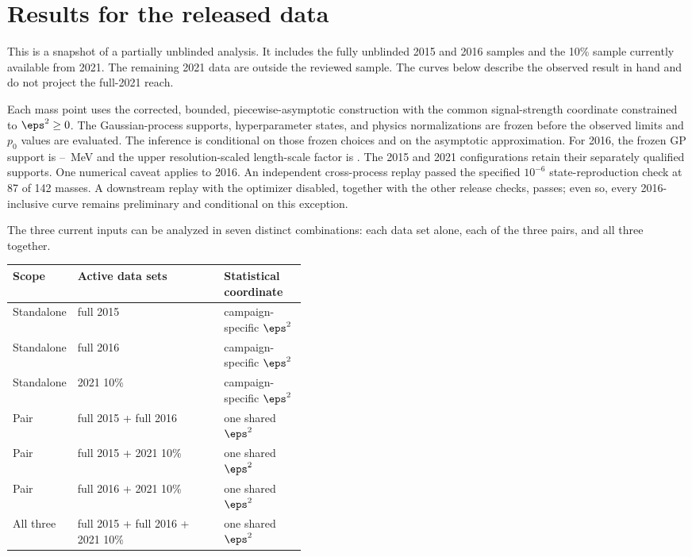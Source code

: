 \section{Results for the released data}
\label{sec:selected-observed-results}


This is a snapshot of a partially unblinded analysis. It includes the fully unblinded
2015 and 2016 samples and the 10\% sample currently available from 2021. The remaining 2021 data are outside the reviewed sample. The curves below
describe the observed result in hand and do not project the full-2021 reach.

Each mass point uses the corrected, bounded, piecewise-asymptotic \CLs{}
construction with the common signal-strength coordinate constrained to
$\eps^2\geq 0$. The Gaussian-process supports, hyperparameter states, and physics
normalizations are frozen before the observed limits and $p_0$ values are evaluated.
The inference is conditional on those frozen choices and on
the asymptotic approximation. For 2016, the frozen GP support is
\FinalSixteenSupportLowMeV--\FinalSixteenSupportHighMeV~MeV and the upper
resolution-scaled length-scale factor is \FinalSixteenLengthScaleUpperFactor. The
2015 and 2021 configurations retain their separately qualified supports.
One numerical caveat applies to 2016. An independent cross-process replay passed the
specified $10^{-6}$ state-reproduction check at 87 of 142 masses. A downstream replay
with the optimizer disabled, together with the other release checks, passes; even so,
every 2016-inclusive curve remains preliminary and conditional on this exception.

The three current inputs can be analyzed in seven distinct combinations: each data set
alone, each of the three pairs, and all three together.

\begin{center}
\small
\begin{tabularx}{\linewidth}{@{}P{0.15\linewidth}Y P{0.28\linewidth}@{}}
\toprule
Scope & Active data sets & Statistical coordinate \\
\midrule
Standalone & full 2015 & campaign-specific $\eps^2$ \\
Standalone & full 2016 & campaign-specific $\eps^2$ \\
Standalone & 2021 10\% & campaign-specific $\eps^2$ \\
Pair & full 2015 + full 2016 & one shared $\eps^2$ \\
Pair & full 2015 + 2021 10\% & one shared $\eps^2$ \\
Pair & full 2016 + 2021 10\% & one shared $\eps^2$ \\
All three & full 2015 + full 2016 + 2021 10\% & one shared $\eps^2$ \\
\bottomrule
\end{tabularx}
\end{center}


